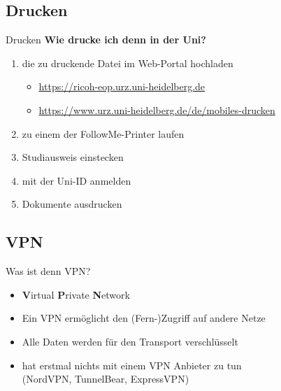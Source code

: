 \subsection{Drucken}
\begin{frame}{Drucken}
    \large \textbf{Wie drucke ich denn in der Uni?}
    \normalsize
    \begin{enumerate}
        \item die zu druckende Datei im Web-Portal hochladen \\
            {\footnotesize
                \begin{itemize}
                    \item \url{https://ricoh-eop.urz.uni-heidelberg.de} \\
                    \item \url{https://www.urz.uni-heidelberg.de/de/mobiles-drucken}
                \end{itemize}
            }
        \item zu einem der FollowMe-Printer laufen
        \item Studiausweis einstecken
        \item mit der Uni-ID anmelden
        \item Dokumente ausdrucken
    \end{enumerate}
\end{frame}


\subsection{VPN}
\begin{frame}{Was ist denn VPN?}
    \large
    \begin{itemize}
        \item \textbf{V}irtual \textbf{P}rivate \textbf{N}etwork
        \item Ein VPN ermöglicht den (Fern-)Zugriff auf andere Netze
        \item Alle Daten werden für den Transport verschlüsselt
        \item hat erstmal nichts mit einem VPN Anbieter zu tun \\
              (NordVPN, TunnelBear, ExpressVPN)
    \end{itemize}
\end{frame}

